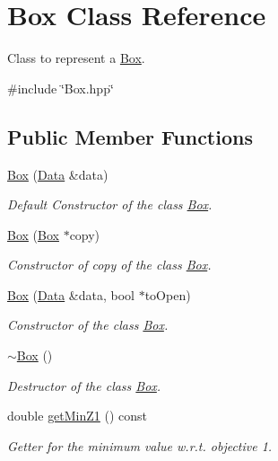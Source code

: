 \hypertarget{classBox}{\section{\-Box \-Class \-Reference}
\label{classBox}
}


\-Class to represent a {\ttfamily \hyperlink{classBox}{\-Box}}.  




{\ttfamily \#include \char`\"{}\-Box.\-hpp\char`\"{}}

\subsection*{\-Public \-Member \-Functions}
\begin{DoxyCompactItemize}
\item 
\hyperlink{classBox_af84a8d0c852cacd9a56d95dd28800719}{\-Box} (\hyperlink{classData}{\-Data} \&data)
\begin{DoxyCompactList}\small\item\em \-Default \-Constructor of the class {\ttfamily \hyperlink{classBox}{\-Box}}. \end{DoxyCompactList}\item 
\hyperlink{classBox_aa77a6681fe6a14a839b9338300338618}{\-Box} (\hyperlink{classBox}{\-Box} $\ast$copy)
\begin{DoxyCompactList}\small\item\em \-Constructor of copy of the class {\ttfamily \hyperlink{classBox}{\-Box}}. \end{DoxyCompactList}\item 
\hyperlink{classBox_ae1095dfaabe0ea4da09ca0e732b4bba3}{\-Box} (\hyperlink{classData}{\-Data} \&data, bool $\ast$to\-Open)
\begin{DoxyCompactList}\small\item\em \-Constructor of the class {\ttfamily \hyperlink{classBox}{\-Box}}. \end{DoxyCompactList}\item 
\hyperlink{classBox_a6a5e09398e85d602a046b429062fb9c2}{$\sim$\-Box} ()
\begin{DoxyCompactList}\small\item\em \-Destructor of the class {\ttfamily \hyperlink{classBox}{\-Box}}. \end{DoxyCompactList}\item 
double \hyperlink{classBox_a95abb72b5848a121c1a44c4ba391cfa4}{get\-Min\-Z1} () const 
\begin{DoxyCompactList}\small\item\em \-Getter for the minimum value w.\-r.\-t. objective 1. \end{DoxyCompactList}\item 

\end{DoxyCompactItemize}

